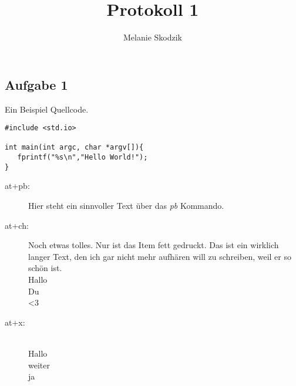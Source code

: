 \documentclass[11pt,a4paper,ngerman]{article}
\date{}
\title{Protokoll 1}
\author{Melanie Skodzik}
\begin{document}


\renewcommand{\figurename}{Grafik}

\maketitle
\thispagestyle{fancy}


\subsection*{Aufgabe 1}

Ein Beispiel Quellcode.


\begin{lstlisting}
#include <std.io>

int main(int argc, char *argv[]){
   fprintf("%s\n","Hello World!");
}
\end{lstlisting}




\begin{description}
   \item[at+pb:] Hier steht ein sinnvoller Text über das \emph{pb} Kommando.
   \item[at+ch:] Noch etwas tolles. Nur ist das Item fett gedruckt. Das ist ein wirklich langer Text, den ich gar nicht mehr aufhären will zu schreiben, weil er so schön ist.\\
      Hallo\\
      Du\\
      <3
   \item[at+x:] \mbox{}\\
      Hallo\\
      weiter\\
      ja
\end{description}

\label{LastPage}
\end{document}
